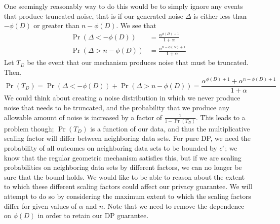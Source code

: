 \documentclass[11pt]{scrartcl} %
\begin{document}
One seemingly reasonably way to do this would be to simply ignore any events that produce truncated noise,
that is if our generated noise $\Delta$ is either less than $-\phi(D)$ or greater than $n - \phi(D)$.
We see that
\begin{align*}
    \Pr\left(\Delta < -\phi(D)\right) &= \frac{\alpha^{\phi(D) + 1}}{1 + \alpha} \\
    \Pr\left(\Delta > n - \phi(D)\right) &= \frac{\alpha^{n - \phi(D) + 1}}{1 + \alpha}
\end{align*}
Let $T_D$ be the event that our mechanism produces noise that must be truncated. Then,
\[ \Pr(T_D) = \Pr\left(\Delta < -\phi(D)\right) + \Pr\left(\Delta > n - \phi(D)\right) = \frac{\alpha^{\phi(D)+1} + \alpha^{n-\phi(D)+1}}{1+\alpha} \]
We could think about creating a noise distribution in which we never produce noise that needs to be truncated, and
the probability that we produce any allowable amount of noise is increased by a factor of $\frac{1}{1 - \Pr(T_D)}$.
This leads to a problem though; $\Pr(T_D)$ is a function of our data, and thus the multiplicative scaling factor
will differ between neighboring data sets. For pure DP, we need the probability of all outcomes on neighboring data sets to be bounded
by $e^{\epsilon}$; we know that the regular geometric mechanism satisfies this, but if we are scaling probabilities
on neighboring data sets by different factors, we can no longer be sure that the bound holds.
We would like to be able to reason about the extent to which these different scaling factors could affect our
privacy guarantee. We will attempt to do so by considering the maximum extent to which the scaling factors differ
for given values of $\alpha$ and $n$. Note that we need to remove the dependence on $\phi(D)$ in order to retain our DP guarantee. \newline
\end{document}
